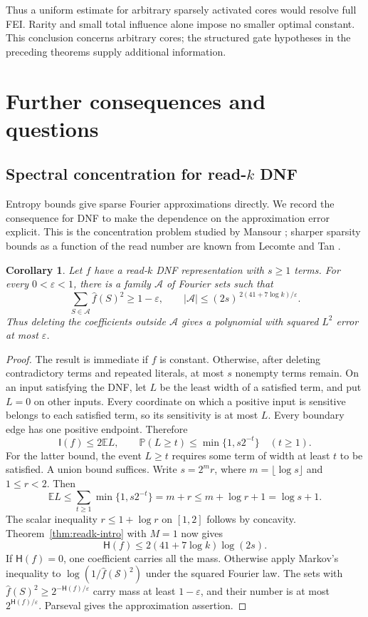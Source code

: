 \documentclass[11pt]{amsart}
\newtheorem{corollary}[theorem]{Corollary}
\theoremstyle{definition}
\theoremstyle{remark}
\newcommand{\E}{\mathbb E}
\renewcommand{\P}{\mathbb P}
\newcommand{\HH}{\mathsf H}
\newcommand{\I}{\mathsf I}
\newcommand{\wh}[1]{\widehat{#1}}
\newcommand{\eps}{\varepsilon}
\begin{document}
Thus a uniform estimate for arbitrary sparsely activated cores would
resolve full FEI. Rarity and small total influence alone impose no
smaller optimal constant. This conclusion concerns arbitrary cores;
the structured gate hypotheses in the preceding theorems supply
additional information.

\section{Further consequences and questions}\label{sec:consequences}

\subsection{Spectral concentration for read-\texorpdfstring{$k$}{k} DNF}

Entropy bounds give sparse Fourier approximations directly. We record the consequence for DNF to make the dependence on the approximation error explicit. This is the concentration problem studied by Mansour \cite{Mansour95}; sharper sparsity bounds as a function of the read number are known from Lecomte and Tan \cite{LT21}.

\begin{corollary}\label{cor:dnf-concentration}
Let $f$ have a read-$k$ DNF representation with $s\ge1$ terms. For every $0<\eps<1$, there is a family $\mathcal A$ of Fourier sets such that
\[
 \sum_{S\in\mathcal A}\wh f(S)^2\ge1-\eps,
 \qquad
 |\mathcal A|\le(2s)^{\,2(41+7\log k)/\eps}.
\]
Thus deleting the coefficients outside $\mathcal A$ gives a polynomial with squared $L^2$ error at most $\eps$.
\end{corollary}
\begin{proof}
The result is immediate if $f$ is constant. Otherwise, after deleting contradictory terms and repeated literals, at most $s$ nonempty terms remain. On an input satisfying the DNF, let $L$ be the least width of a satisfied term, and put $L=0$ on other inputs. Every coordinate on which a positive input is sensitive belongs to each satisfied term, so its sensitivity is at most $L$. Every boundary edge has one positive endpoint. Therefore
\[
 \I(f)\le2\E L,
 \qquad
 \P(L\ge t)\le\min\{1,s2^{-t}\}\quad(t\ge1).
\]
For the latter bound, the event $L\ge t$ requires some term of width at least $t$ to be satisfied. A union bound suffices. Write $s=2^m r$, where $m=\lfloor\log s\rfloor$ and $1\le r<2$. Then
\[
 \E L\le\sum_{t\ge1}\min\{1,s2^{-t}\}
 =m+r\le m+\log r+1=\log s+1.
\]
The scalar inequality $r\le1+\log r$ on $[1,2]$ follows by concavity. Theorem~\ref{thm:readk-intro} with $M=1$ now gives
\[
 \HH(f)\le2(41+7\log k)\log(2s).
\]
If $\HH(f)=0$, one coefficient carries all the mass. Otherwise apply Markov's inequality to $\log(1/\wh f(\mathcal S)^2)$ under the squared Fourier law. The sets with $\wh f(S)^2\ge2^{-\HH(f)/\eps}$ carry mass at least $1-\eps$, and their number is at most $2^{\HH(f)/\eps}$. Parseval gives the approximation assertion.
\end{proof}
\end{document}
